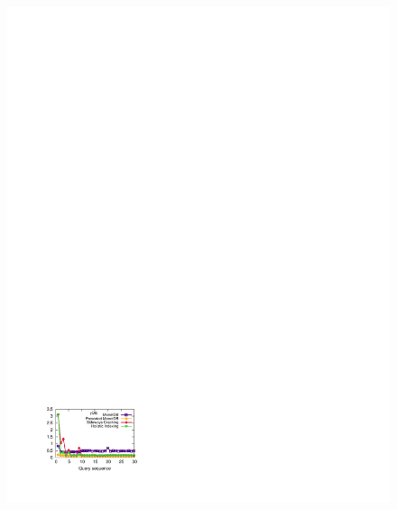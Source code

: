 \begin{figure}[t]
\begin{center}
{            \includegraphics[trim=3cm 2cm 15cm 22.5cm]{Figures/holistic/tpch_q6}
        }%
\end{center}
\end{figure}
